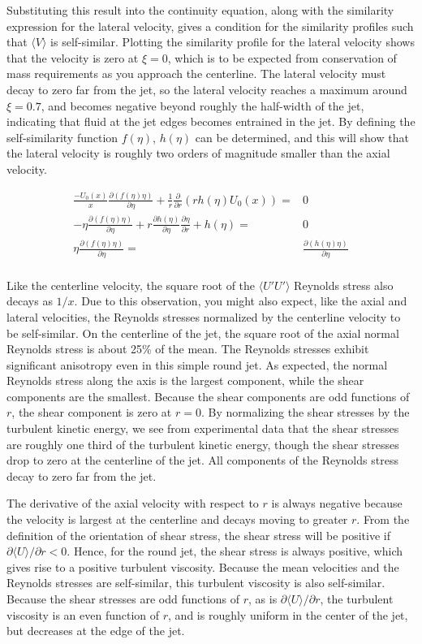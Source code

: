 \documentclass[10pt]{article}
\newcommand{\beqa}{\begin{equation}\begin{aligned}}
\newcommand{\eeqa}{\end{aligned}\end{equation}}
\newcommand{\la}{\langle}
\newcommand{\ra}{\rangle}
\begin{document}
\begin{flushleft}
Substituting this result into the continuity equation, along with the similarity expression for the lateral velocity, gives a condition for the similarity profiles such that \(\la V\ra\) is self-similar. Plotting the similarity profile for the lateral velocity shows that the velocity is zero at \(\xi=0\), which is to be expected from conservation of mass requirements as you approach the centerline. The lateral velocity must decay to zero far from the jet, so the lateral velocity reaches a maximum around \(\xi=0.7\), and becomes negative beyond roughly the half-width of the jet, indicating that fluid at the jet edges becomes entrained in the jet. By defining the self-similarity function \(f(\eta)\), \(h(\eta)\) can be determined, and this will show that the lateral velocity is roughly two orders of magnitude smaller than the axial velocity. 

\beqa
\frac{-U_0(x)}{x}\frac{\partial (f(\eta)\eta)}{\partial\eta}+\frac{1}{r}\frac{\partial}{\partial r}\left(rh(\eta)U_0(x)\right)=&0\\
-\eta\frac{\partial (f(\eta)\eta)}{\partial\eta}+r\frac{\partial h(\eta)}{\partial \eta}\frac{\partial\eta}{\partial r}+h(\eta)=&0\\
\eta\frac{\partial (f(\eta)\eta)}{\partial\eta}=&\frac{\partial (h(\eta)\eta)}{\partial \eta}\\
\eeqa

Like the centerline velocity, the square root of the \(\la U'U'\ra\) Reynolds stress also decays as \(1/x\). Due to this observation, you might also expect, like the axial and lateral velocities, the Reynolds stresses normalized by the centerline velocity to be self-similar. On the centerline of the jet, the square root of the axial normal Reynolds stress is about 25\% of the mean. The Reynolds stresses exhibit significant anisotropy even in this simple round jet. As expected, the normal Reynolds stress along the axis is the largest component, while the shear components are the smallest. Because the shear components are odd functions of \(r\), the shear component is zero at \(r=0\). By normalizing the shear stresses by the turbulent kinetic energy, we see from experimental data that the shear stresses are roughly one third of the turbulent kinetic energy, though the shear stresses drop to zero at the centerline of the jet. All components of the Reynolds stress decay to zero far from the jet.

The derivative of the axial velocity with respect to \(r\) is always negative because the velocity is largest at the centerline and decays moving to greater \(r\). From the definition of the orientation of shear stress, the shear stress will be positive if \(\partial\la U\ra/\partial r<0\). Hence, for the round jet, the shear stress is always positive, which gives rise to a positive turbulent viscosity. Because the mean velocities and the Reynolds stresses are self-similar, this turbulent viscosity is also self-similar. Because the shear stresses are odd functions of \(r\), as is \(\partial\la U\ra/\partial r\), the turbulent viscosity is an even function of \(r\), and is roughly uniform in the center of the jet, but decreases at the edge of the jet. 


\end{flushleft}
\end{document}
